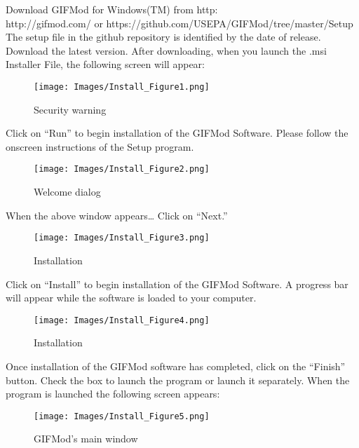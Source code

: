 Download GIFMod for Windows(TM) from
http:\\http://gifmod.com/ or https://github.com/USEPA/GIFMod/tree/master/Setup \\
The setup file in the github repository is identified by the date of release. Download the latest version. 
After downloading, when you launch the .msi Installer File, the following screen will appear: 

\begin{figure}[!ht]\label{fig:ins1}
\begin{center}
\texttt{[image: Images/Install\_Figure1.png]} \\
\caption{Security warning} 
\end{center}
\end{figure}

Click on “Run” to begin installation of the GIFMod Software. Please follow the onscreen instructions of the Setup program.


\begin{figure}[!ht]\label{fig:ins2}
\begin{center}
\texttt{[image: Images/Install\_Figure2.png]} \\
\caption{Welcome dialog} 
\end{center}
\end{figure}

When the above window appears… Click on “Next.” 

\begin{figure}[!ht]\label{fig:ins3}
\begin{center}
\texttt{[image: Images/Install\_Figure3.png]} \\
\caption{Installation} 
\end{center}
\end{figure}

Click on “Install” to begin installation of the GIFMod Software. A progress bar will appear while the software is loaded to your computer.

\begin{figure}[!ht]\label{fig:ins4}
\begin{center}
\texttt{[image: Images/Install\_Figure4.png]} \\
\caption{Installation} 
\end{center}
\end{figure}

Once installation of the GIFMod software has completed, click on the “Finish” button. Check the box to launch the program or launch it separately. When the program is launched the following screen appears:

\begin{figure}[!ht]\label{fig:ins5}
\begin{center}
\texttt{[image: Images/Install\_Figure5.png]} \\
\caption{GIFMod's main window} 
\end{center}
\end{figure}



